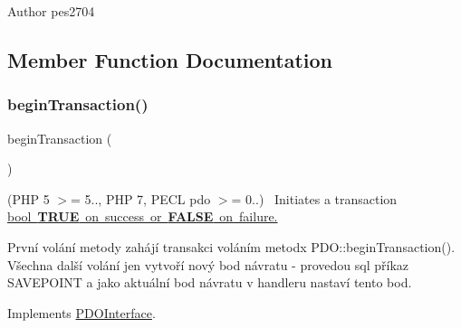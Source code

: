 \begin{DoxyAuthor}{Author}
pes2704 
\end{DoxyAuthor}


\subsection{Member Function Documentation}
\mbox{\label{class_pes_1_1_database_1_1_handler_1_1_nested_transaction_handler_af3380f3b13931d581fa973a382946b32}} 
\subsubsection{\texorpdfstring{begin\+Transaction()}{beginTransaction()}}
{\footnotesize\ttfamily begin\+Transaction (\begin{DoxyParamCaption}{ }\end{DoxyParamCaption})}

(P\+HP 5 $>$= 5.., P\+HP 7, P\+E\+CL pdo $>$= 0..)~\newline
 Initiates a transaction \mbox{\hyperlink{}{bool {\bfseries T\+R\+UE} on success or {\bfseries F\+A\+L\+SE} on failure.}}

První volání metody zahájí transakci voláním metodx P\+D\+O\+::begin\+Transaction(). Všechna další volání jen vytvoří nový bod návratu -\/ provedou sql příkaz S\+A\+V\+E\+P\+O\+I\+NT a jako aktuální bod návratu v handleru nastaví tento bod. 

Implements \mbox{\hyperlink{interface_pes_1_1_database_1_1_handler_1_1_p_d_o_interface_af3380f3b13931d581fa973a382946b32}{P\+D\+O\+Interface}}.

\mbox{\label{class_pes_1_1_database_1_1_handler_1_1_nested_transaction_handler_af5674c27d4a92f6228565010eacbb9cb}} 

